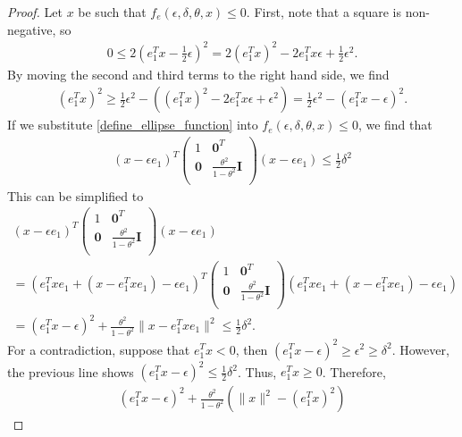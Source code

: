\begin{proof}
Let $x$ be such that $f_e(\epsilon, \delta, \theta, x) \le 0$.
First, note that a square is non-negative, so
\begin{align*}
0 \le 2(e_1^Tx - \frac 1 2 \epsilon )^2
= 2(e_1^Tx)^2 - 2e_1^Tx\epsilon + \frac 1 2 \epsilon^2.
\end{align*}
By moving the second and third terms to the right hand side, we find
\begin{align}
(e_1^Tx)^2 \ge \frac 1 2 \epsilon^2 - \left((e_1^Tx)^2 - 2e_1^Tx\epsilon + \epsilon^2\right) 
= \frac 1 2 \epsilon^2 - (e_1^Tx - \epsilon)^2. \label{ellipse_in_cone_eqn1}
\end{align}
If we substitute \cref{define_ellipse_function} into $f_e(\epsilon, \delta, \theta, x) \le 0$, we find that
\begin{align*}
(x - \epsilon e_1)^T\begin{pmatrix}
1 & \boldsymbol0^T \\
\boldsymbol 0 & \frac{\theta^2}{1 - \theta^2} \boldsymbol I \\
\end{pmatrix}(x - \epsilon e_1) \le \frac 1 2 \delta^2
\end{align*}
This can be simplified to
\begin{align*}
(x - \epsilon e_1)^T\begin{pmatrix}
1 & \boldsymbol0^T \\
\boldsymbol 0 & \frac{\theta^2}{1 - \theta^2} \boldsymbol I \\
\end{pmatrix}(x - \epsilon e_1) \\
 = (e_1^Txe_1 + (x - e_1^Txe_1) - \epsilon e_1)^T\begin{pmatrix}
1 & \boldsymbol0^T \\
\boldsymbol 0 & \frac{\theta^2}{1 - \theta^2} \boldsymbol I \\
\end{pmatrix}(e_1^Txe_1 + (x - e_1^Txe_1) - \epsilon e_1)  \\
=
(e_1^Tx - \epsilon)^2 + \frac{\theta^2}{1 - \theta^2}\|x - e_1^Tx e_1\|^2 \le \frac 1 2 \delta^2.
\end{align*}
For a contradiction, suppose that $e_1^Tx < 0$, then $(e_1^Tx - \epsilon)^2 \ge \epsilon^2 \ge \delta^2$.
However, the previous line shows $(e_1^Tx - \epsilon)^2 \le \frac 1 2 \delta^2$.
Thus, $e_1^Tx \ge 0$.
Therefore,
\begin{align*}
(e_1^Tx - \epsilon)^2 + \frac{\theta^2}{1 - \theta^2}\left(\|x\|^2 - (e_1^Tx)^2\right) 

\end{align*}
\end{proof}
